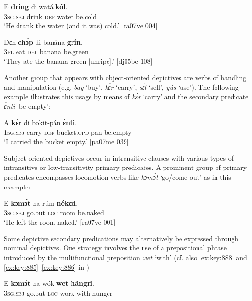 \ea%
    \label{ex:key:1591}
    \gll E    \textbf{dríng}  di  watá  \textbf{kól}.\\
\textsc{3sg.sbj}  drink  \textsc{def}  water  be.cold\\

\glt ‘He drank the water (and it was) cold.’ [ra07ve 004]
\z


\ea%
    \label{ex:key:1592}
    \gll Dɛn  \textbf{chɔ́p}  di  banána  \textbf{grín}.\\
\textsc{3pl}  eat    \textsc{def}  banana  be.green\\

\glt ‘They ate the banana green [unripe].’ [dj05be 108]
\z

Another group that appears with object-oriented depictives are verbs of handling and manipulation (e.g. \textit{bay} ‘buy’, \textit{kɛ́r} ‘carry’, \textit{sɛ́l} ‘sell’, \textit{yús} ‘use’). The following example illustrates this usage by means of \textit{kɛ́r} ‘carry’ and the secondary predicate \textit{ɛ́nti} ‘be empty’:


\ea%
    \label{ex:key:1593}
    \gll A    \textbf{kɛ́r}    di  bokit-pán    \textbf{ɛ́nti}.\\
\textsc{1sg.sbj}  carry  \textsc{def}  bucket.\textsc{cpd}{}-pan  be.empty\\

\glt ‘I carried the bucket empty.’ [pa07me 039]
\z

Subject-oriented depictives occur in intransitive clauses with various types of intransitive or low-transitivity primary predicates. A prominent group of primary predicates encompasses locomotion verbs like \textit{kɔmɔ́t} ‘go/come out’ as in this example: 


\ea%
    \label{ex:key:1594}
    \gll E    \textbf{kɔmɔ́t}  na  rúm    \textbf{nékɛd}.\\
\textsc{3sg.sbj}  go.out  \textsc{loc}  room  be.naked\\

\glt ‘He left the room naked.’ [ra07ve 001]
\z

Some depictive secondary predications may alternatively be expressed through nominal depictives. One strategy involves the use of a prepositional phrase introduced by the multifunctional preposition \textit{wet} ‘with’ (cf. also \ref{ex:key:888} and \ref{ex:key:885}–\ref{ex:key:886} in ): 


\ea%
    \label{ex:key:1595}
    \gll E    \textbf{kɔmɔ́t}  na  wók    \textbf{wet}    \textbf{hángri}.\\
\textsc{3sg.sbj}  go.out  \textsc{loc}  work  with    hunger\\

